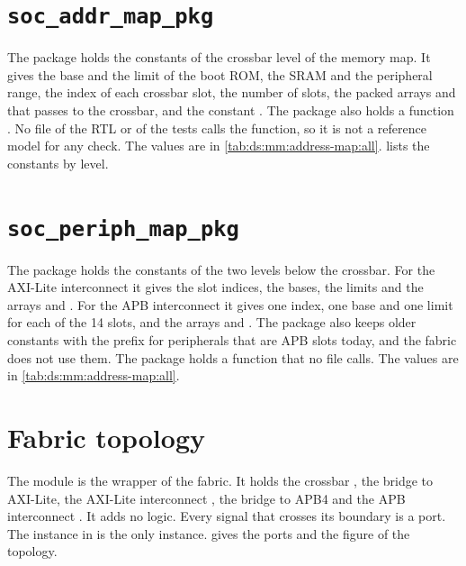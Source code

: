 \section{\texttt{soc\_addr\_map\_pkg}}\label{ds:mod:soc-addr-map-pkg}
The package  holds the constants of the crossbar level of the memory map. It gives the base and the limit of the boot ROM, the SRAM and the peripheral range, the index of each crossbar slot, the number of slots, the packed arrays  and  that  passes to the crossbar, and the constant . The package also holds a function . No file of the RTL or of the tests calls the function, so it is not a reference model for any check. The values are in \cref{tab:ds:mm:address-map:all}.  lists the constants by level.

\section{\texttt{soc\_periph\_map\_pkg}}\label{ds:mod:soc-periph-map-pkg}
The package  holds the constants of the two levels below the crossbar. For the AXI-Lite interconnect it gives the slot indices, the bases, the limits and the arrays  and . For the APB interconnect it gives one index, one base and one limit for each of the 14 slots, and the arrays  and . The package also keeps older constants with the prefix  for peripherals that are APB slots today, and the fabric does not use them. The package holds a function  that no file calls. The values are in \cref{tab:ds:mm:address-map:all}.

\section{Fabric topology}\label{ds:mod:soc-bus}
The module  is the wrapper of the fabric. It holds the crossbar , the bridge  to AXI-Lite, the AXI-Lite interconnect , the bridge  to APB4 and the APB interconnect . It adds no logic. Every signal that crosses its boundary is a port. The instance  in  is the only instance.  gives the ports and the figure of the topology.

